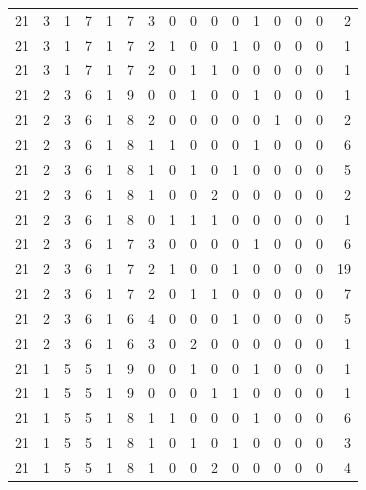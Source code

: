 \begin{appendix}
{\begin{longtable}{lrrrrrrrrrrrrrrr}
    21        & 3  & 1  & 7  & 1  & 7  & 3  & 0  & 0  & 0  & 0  & 1  & 0   & 0   & 0   & 2    \\
    21        & 3  & 1  & 7  & 1  & 7  & 2  & 1  & 0  & 0  & 1  & 0  & 0   & 0   & 0   & 1    \\
    21        & 3  & 1  & 7  & 1  & 7  & 2  & 0  & 1  & 1  & 0  & 0  & 0   & 0   & 0   & 1    \\
    21        & 2  & 3  & 6  & 1  & 9  & 0  & 0  & 1  & 0  & 0  & 1  & 0   & 0   & 0   & 1    \\
    21        & 2  & 3  & 6  & 1  & 8  & 2  & 0  & 0  & 0  & 0  & 0  & 1   & 0   & 0   & 2    \\
    21        & 2  & 3  & 6  & 1  & 8  & 1  & 1  & 0  & 0  & 0  & 1  & 0   & 0   & 0   & 6    \\
    21        & 2  & 3  & 6  & 1  & 8  & 1  & 0  & 1  & 0  & 1  & 0  & 0   & 0   & 0   & 5    \\
    21        & 2  & 3  & 6  & 1  & 8  & 1  & 0  & 0  & 2  & 0  & 0  & 0   & 0   & 0   & 2    \\
    21        & 2  & 3  & 6  & 1  & 8  & 0  & 1  & 1  & 1  & 0  & 0  & 0   & 0   & 0   & 1    \\
    21        & 2  & 3  & 6  & 1  & 7  & 3  & 0  & 0  & 0  & 0  & 1  & 0   & 0   & 0   & 6    \\
    21        & 2  & 3  & 6  & 1  & 7  & 2  & 1  & 0  & 0  & 1  & 0  & 0   & 0   & 0   & 19   \\
    21        & 2  & 3  & 6  & 1  & 7  & 2  & 0  & 1  & 1  & 0  & 0  & 0   & 0   & 0   & 7    \\
    21        & 2  & 3  & 6  & 1  & 6  & 4  & 0  & 0  & 0  & 1  & 0  & 0   & 0   & 0   & 5    \\
    21        & 2  & 3  & 6  & 1  & 6  & 3  & 0  & 2  & 0  & 0  & 0  & 0   & 0   & 0   & 1    \\
    21        & 1  & 5  & 5  & 1  & 9  & 0  & 0  & 1  & 0  & 0  & 1  & 0   & 0   & 0   & 1    \\
    21        & 1  & 5  & 5  & 1  & 9  & 0  & 0  & 0  & 1  & 1  & 0  & 0   & 0   & 0   & 1    \\
    21        & 1  & 5  & 5  & 1  & 8  & 1  & 1  & 0  & 0  & 0  & 1  & 0   & 0   & 0   & 6    \\
    21        & 1  & 5  & 5  & 1  & 8  & 1  & 0  & 1  & 0  & 1  & 0  & 0   & 0   & 0   & 3    \\
    21        & 1  & 5  & 5  & 1  & 8  & 1  & 0  & 0  & 2  & 0  & 0  & 0   & 0   & 0   & 4    \\

\end{longtable}}
\end{appendix}
